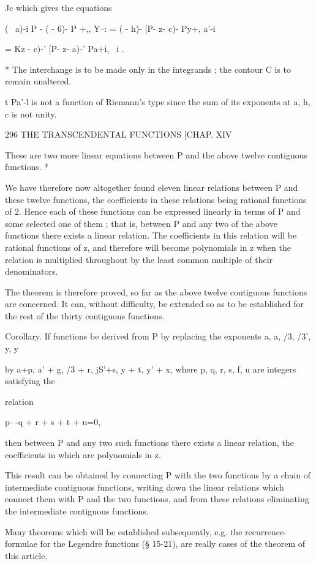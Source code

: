 Jc which gives the equations

( \ a)-i P - ( - 6)- P +,, Y--: = ( - h)- [P- z- c)- Py+, a'-i

= Kz - c)-' [P- z- a)-' Pa+i, \ i .

* The interchange is to be made only in the integrands ; the contour C
is to remain unaltered.

t Pa'-l is not a function of Riemann's type since the sum of its
exponents at a, h, c is not unity.

296 THE TRANSCENDENTAL FUNCTIONS [CHAP. XIV

These are two more linear equations between P and the above twelve
contiguous functions. *

We have therefore now altogether found eleven linear relations between
P and these twelve functions, the coefficients in these relations
being rational functions of 2. Hence each of these functions can be
expressed linearly in terms of P and some selected one of them ; that
is, between P and any two of the above functions there exists a linear
relation. The coefficients in this relation will be rational functions
of z, and therefore will become polynomials in z when the relation is
multiplied throughout by the least common multiple of their
denominators.

The theorem is therefore proved, so far as the above twelve contiguous
functions are concerned. It can, without difficulty, be extended so as
to be established for the rest of the thirty contiguous functions.

Corollary. If functions be derived from P by replacing the exponents
a, a, /3, /3', y, y

by a+p, a' + g, /3 + r, jS'+s, y + t, y' + x, where p, q, r, s, f, u
are integers satisfying the

relation

p- -q + r + s + t + u=0,

then between P and any two such functions there exists a linear
relation, the coefficients in which are polynomials in z.

This result can be obtained by connecting P with the two functions by
a chain of intermediate contiguous functions, writing down the linear
relations which connect them with P and the two functions, and from
these relations eliminating the intermediate contiguous functions.

Many theorems which will be established subsequently, e.g. the
recurrence-formulae for the Legendre functions (§ 15-21), are really
cases of the theorem of this article.

